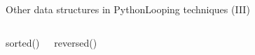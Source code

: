 \documentclass[10pt,compress]{beamer} %
\begin{document}
\begin{frame}{Other data structures in Python}{Looping techniques (III)}
    \begin{columns}
 	   \column{\textwidth}
		\begin{block}{sorted()}
		\vspace{-0.2cm}
		
		\vspace{-0.2cm}
		\end{block}

		\begin{block}{reversed()}
		\vspace{-0.2cm}
		
		\vspace{-0.2cm}
		\end{block}

	\end{columns}
\end{frame}
\end{document}
